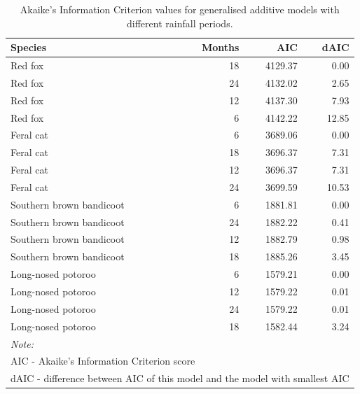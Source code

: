 \documentclass[11pt,a4paper,titlepage,twoside,openright]{style/unimelbthesis}
\begin{document}
\begin{mainmatter}
\begingroup\fontsize{10}{12}\selectfont
\begin{longtable}[t]{lrrr}
\caption{\label{tab:occ-rain-aic}Akaike's Information Criterion values for generalised additive models with different rainfall periods.}\\
\toprule
Species & Months & AIC & dAIC\\
\midrule
Red fox & 18 & 4129.37 & 0.00\\
Red fox & 24 & 4132.02 & 2.65\\
Red fox & 12 & 4137.30 & 7.93\\
Red fox & 6 & 4142.22 & 12.85\\
Feral cat & 6 & 3689.06 & 0.00\\
\addlinespace
Feral cat & 18 & 3696.37 & 7.31\\
Feral cat & 12 & 3696.37 & 7.31\\
Feral cat & 24 & 3699.59 & 10.53\\
Southern brown bandicoot & 6 & 1881.81 & 0.00\\
Southern brown bandicoot & 24 & 1882.22 & 0.41\\
\addlinespace
Southern brown bandicoot & 12 & 1882.79 & 0.98\\
Southern brown bandicoot & 18 & 1885.26 & 3.45\\
Long-nosed potoroo & 6 & 1579.21 & 0.00\\
Long-nosed potoroo & 12 & 1579.22 & 0.01\\
Long-nosed potoroo & 24 & 1579.22 & 0.01\\
\addlinespace
Long-nosed potoroo & 18 & 1582.44 & 3.24\\
\bottomrule
\multicolumn{4}{l}{\rule{0pt}{1em}\textit{Note: }}\\
\multicolumn{4}{l}{\rule{0pt}{1em}AIC - Akaike's Information Criterion score}\\
\multicolumn{4}{l}{\rule{0pt}{1em}dAIC - difference between AIC of this model and the model with smallest AIC}\\
\end{longtable}
\endgroup{}

\newpage
\begin{figure}


\end{figure}
\end{mainmatter}
\end{document}
